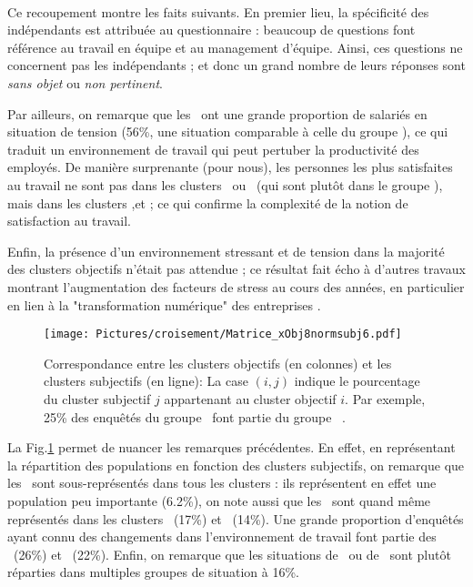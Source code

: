 \documentclass[11pt,fleqn,openany,frenchb]{book} %
\begin{document}
\paragraph{}
Ce recoupement montre les faits suivants. En premier lieu, la spécificité des indépendants est attribuée au questionnaire : beaucoup de questions font référence au travail en équipe et au management d'équipe. Ainsi, ces questions ne concernent pas les indépendants ; et donc un grand nombre de leurs réponses sont {\em sans objet} ou {\em non pertinent}. 

Par ailleurs, on remarque que les \ACC\ ont une grande proportion de salariés en situation de tension (56\%, une situation comparable à celle du groupe \SANTE), ce qui traduit un environnement de travail qui peut pertuber la productivité des employés. De manière surprenante (pour nous), les personnes les plus satisfaites au travail ne sont pas dans les clusters \CSPPPr\ ou \CSPPPu\ (qui sont plutôt dans le groupe \RAS), mais dans les clusters \SERV,\IMM et \OUVR ; ce qui confirme la complexité de la notion de satisfaction au travail. 

Enfin, la présence d'un environnement stressant et de tension dans la majorité des clusters objectifs n'était pas attendue ;  ce résultat fait écho à d'autres travaux montrant l'augmentation des facteurs de stress au cours des années, en particulier en lien à la "transformation numérique" des entreprises \cite{datchary2011dispersion}. 


\begin{figure}[!h]
\center
\texttt{[image: Pictures/croisement/Matrice\_xObj8normsubj6.pdf]}
\caption{Correspondance entre les clusters objectifs (en colonnes) et les clusters subjectifs (en ligne): La case $(i,j)$ indique le pourcentage du cluster subjectif $j$ appartenant au cluster objectif $i$. Par exemple, 25\% des enquêtés du groupe \GLOB\ font partie du groupe \CSPPPr\ .}
\label{fig:objxnormsubj}
\end{figure} %

La Fig.\ref{fig:objxnormsubj} permet de nuancer les remarques précédentes. En effet, en représentant la répartition des populations en fonction des clusters subjectifs, on remarque que les \IMM\ sont sous-représentés dans tous les clusters : ils représentent en effet une population peu importante (6.2\%), on note aussi que les \HEUR\ sont quand même représentés dans les clusters \CSPPPr\ (17\%) et \CSPPPu\ (14\%). Une grande proportion d'enquêtés ayant connu des changements dans l'environnement de travail font partie des \CSPPPr\ (26\%) et \CSPPPu\ (22\%). Enfin, on remarque que les situations de \MALH\ ou de \GLOB\ sont plutôt réparties dans multiples groupes de situation à 16\%.
\end{document}

